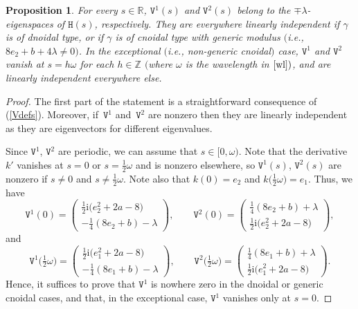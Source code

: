 \documentclass[10pt,a4paper]{amsart}
\newcommand\kk{k} %
\def\ri{\mathrm{i}}
\def\gam{\gamma} %
\def\R{\mathbb R}
\def\Z{\mathbb Z}
\newcommand\tV{\mathtt{V}}
\numberwithin{equation}{section}
\newtheorem{Proposition}[Theorem]{Proposition}
 { \theoremstyle{definition}
\newtheorem{Definition}[Theorem]{Definition}
\newtheorem{Note}[Theorem]{Note}
\newtheorem{Example}[Theorem]{Example}
\newtheorem{Remark}[Theorem]{Remark} }
\begin{document}
\begin{Proposition}\label{exceptional} For every $s \in \R$, ${\mathtt V}^1(s)$ and ${\mathtt V}^2(s)$ belong to the $\mp\lambda$-eigenspaces of ${\mathtt H}(s)$, respectively. They are everywhere linearly independent if $\gam$ is of dnoidal type, or if $\gam$ is of cnoidal type with {\it generic modulus} $($i.e., $8e_2+b+4\lambda\neq 0)$. In the exceptional $($i.e., non-generic cnoidal$)$ case, ${\mathtt V}^1$ and ${\mathtt V}^2$ vanish at $s=h\omega$ for each $h\in \Z$ $($where $\omega$ is the wavelength in $\eqref{wl})$, and are linearly independent everywhere else.

 \end{Proposition}


 \begin{proof}
 The first part of the statement is a straightforward consequence of (\ref{Vdefs}).
Moreover, if~${\mathtt V}^1$ and~${\mathtt V}^2$ are nonzero then they are
linearly independent as they are eigenvectors for different eigenvalues.

Since $\tV^1$, $\tV^2$ are periodic, we can assume that $s\in [0, \omega)$.
Note that the derivative $\kk'$ vanishes at $s=0$ or $s=\tfrac12 \omega$ and is nonzero elsewhere, so
$\tV^1(s)$, $\tV^2(s)$ are nonzero if $s\ne 0$ and $s\ne \tfrac12 \omega$.
Note also that $\kk(0) = e_2$ and $\kk\bigl(\tfrac12\omega\bigr) = e_1$.
Thus, we have
\[\renewcommand{\arraystretch}{1.1}
 \tV^1(0)=\begin{pmatrix} \tfrac12 {\ri}\bigl(e_2^2+2a-8\bigr) \\ -\frac{1}{4}(8e_2+b)-\lambda\end{pmatrix}, \qquad
 \tV^2(0)=\begin{pmatrix} \frac{1}{4}(8e_2+b)+\lambda \\ \tfrac12 {\ri}\bigl(e_2^2+2a-8\bigr)\end{pmatrix},
\]
and
\[\renewcommand{\arraystretch}{1.1}
\tV^1\bigl(\tfrac12\omega\bigr)=\begin{pmatrix}\tfrac12 \ri \bigl(e_1^2+2a-8\bigr)\\ -\frac{1}{4}(8e_1+b)-\lambda\end{pmatrix},\qquad
\tV^2\bigl(\tfrac12\omega\bigr)=\begin{pmatrix} \frac{1}{4}(8e_1+b)+\lambda\\ \tfrac12 {\ri}\bigl(e_1^2+2a-8\bigr)\end{pmatrix}.
\]
Hence, it suffices to prove that
${\mathtt V}^1$ is nowhere zero in the dnoidal or generic cnoidal cases, and that, in the exceptional case, ${\mathtt V}^1$ vanishes only at $s=0$.


\end{proof}
\end{document}
